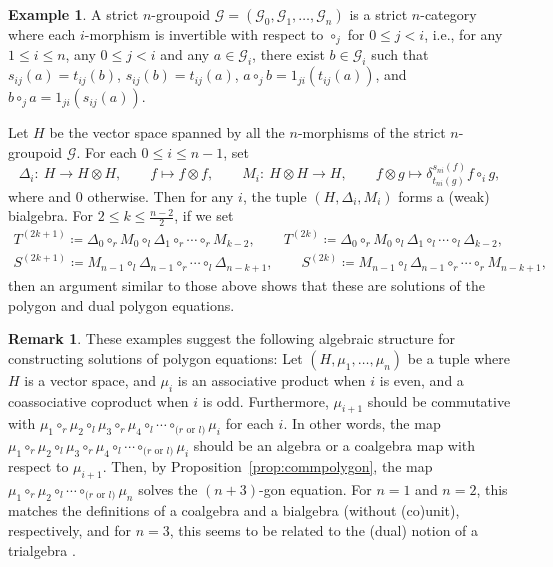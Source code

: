 \documentclass[pdftex]{sigma}
\numberwithin{equation}{section}
\theoremstyle{definition}
\newtheorem{Example}[Theorem]{Example}
\newtheorem{Remark}[Theorem]{Remark}
\begin{document}
\begin{Example}
 A strict $n$-groupoid $\mathcal{G}=(\mathcal{G}_0,\mathcal{G}_1,\dots,\mathcal{G}_n)$ is a strict $n$-category where each $i$-morphism is invertible with respect to $\circ_j$ for $0\leq j<i$, i.e., for any $1\leq i \leq n$, any $0\leq j <i$ and any $a\in \mathcal{G}_i$, there exist $b\in\mathcal{G}_i$ such that $s_{ij}(a)=t_{ij}(b)$, $s_{ij}(b)=t_{ij}(a)$, $a \circ_{j} b=1_{ji}(t_{ij}(a))$, and $b \circ_{j} a=1_{ji}(s_{ij}(a))$.

 Let $H$ be the vector space spanned by all the $n$-morphisms of the strict $n$-groupoid $\mathcal{G}$.
 For each $0 \leq i \leq n-1$, set
 \begin{equation*}
 \Delta_i \colon \ H \to H \otimes H,\qquad f\mapsto f \otimes f, \qquad M_i \colon \ H \otimes H \to H, \qquad f \otimes g\mapsto \delta^{s_{ni}(f)}_{t_{ni}(g)}f\circ_{i}g,
 \end{equation*}
 where  and $0$ otherwise.
 Then for any $i$, the tuple $(H, \Delta_i ,M_i)$
 forms a (weak) bialgebra.
 For $2\leq k \leq \frac{n-2}{2}$, if we set
 \begin{gather*}
 T^{(2k+1)} \coloneqq \Delta_0 \circ_r M_0 \circ_l \Delta_1 \circ_r \cdots \circ_{r} M_{k-2}, \qquad T^{(2k)} \coloneqq \Delta_0 \circ_r M_0 \circ_l \Delta_1 \circ_l \cdots \circ_{l} \Delta_{k-2},\\
 S^{(2k+1)} \coloneqq M_{n-1} \circ_l \Delta_{n-1} \circ_r \cdots \circ_l \Delta_{n-k+1}, \qquad S^{(2k)} \coloneqq M_{n-1} \circ_l \Delta_{n-1} \circ_r \cdots \circ_r M_{n-k+1},
 \end{gather*}
 then an argument similar to those above shows that these are solutions of the polygon and dual polygon equations.
\end{Example}

\begin{Remark}
 These examples suggest the following algebraic structure for constructing solutions of polygon equations: Let $(H, \mu_1, \dots ,\mu_n)$ be a tuple where $H$ is a vector space, and $\mu_i$ is an associative product when $i$ is even, and a coassociative coproduct when $i$ is odd.
 Furthermore, $\mu_{i+1}$ should be commutative with $\mu_1\circ_r\mu_2\circ_l\mu_3\circ_r\mu_4\circ_l\cdots\circ_{\text{($r$ or $l$)}}\mu_i$ for each $i$.
 In other words, the map $\mu_1\circ_r\mu_2\circ_l\mu_3\circ_r\mu_4\circ_l\cdots\circ_{\text{($r$ or $l$)}}\mu_i$ should be an algebra or a coalgebra map with respect to $\mu_{i+1}$. Then, by Proposition~\ref{prop:commpolygon}, the map $\mu_1\circ_r\mu_2\circ_l\cdots\circ_{\text{($r$ or $l$)}}\mu_n$ solves the $(n+3)$-gon equation.
 For $n=1$ and $n=2$, this matches the definitions of a coalgebra and a bialgebra (without (co)unit), respectively, and for $n=3$, this seems to be related to the (dual) notion of a trialgebra \cite{crane1994four, grosse2000trialgebraic, grosse2000second, pfeiffer20072}.
\end{Remark}
\end{document}

